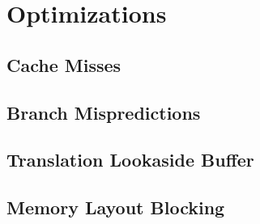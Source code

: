 \section{Optimizations}



\subsection{Cache Misses}

\subsection{Branch Mispredictions}

\subsection{Translation Lookaside Buffer}

\subsection{Memory Layout Blocking}